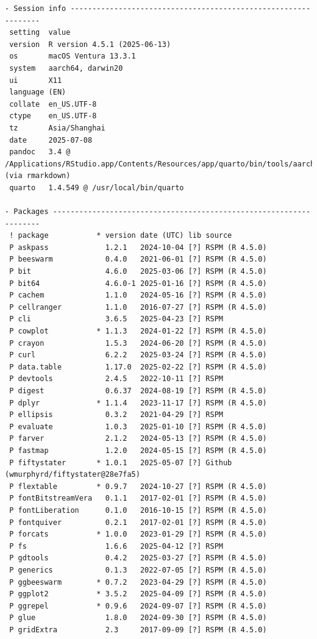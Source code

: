 \documentclass[
  12pt,
]{article}
\begin{document}
\begin{verbatim}
- Session info ---------------------------------------------------------------
 setting  value
 version  R version 4.5.1 (2025-06-13)
 os       macOS Ventura 13.3.1
 system   aarch64, darwin20
 ui       X11
 language (EN)
 collate  en_US.UTF-8
 ctype    en_US.UTF-8
 tz       Asia/Shanghai
 date     2025-07-08
 pandoc   3.4 @ /Applications/RStudio.app/Contents/Resources/app/quarto/bin/tools/aarch64/ (via rmarkdown)
 quarto   1.4.549 @ /usr/local/bin/quarto

- Packages -------------------------------------------------------------------
 ! package           * version date (UTC) lib source
 P askpass             1.2.1   2024-10-04 [?] RSPM (R 4.5.0)
 P beeswarm            0.4.0   2021-06-01 [?] RSPM (R 4.5.0)
 P bit                 4.6.0   2025-03-06 [?] RSPM (R 4.5.0)
 P bit64               4.6.0-1 2025-01-16 [?] RSPM (R 4.5.0)
 P cachem              1.1.0   2024-05-16 [?] RSPM (R 4.5.0)
 P cellranger          1.1.0   2016-07-27 [?] RSPM (R 4.5.0)
 P cli                 3.6.5   2025-04-23 [?] RSPM
 P cowplot           * 1.1.3   2024-01-22 [?] RSPM (R 4.5.0)
 P crayon              1.5.3   2024-06-20 [?] RSPM (R 4.5.0)
 P curl                6.2.2   2025-03-24 [?] RSPM (R 4.5.0)
 P data.table          1.17.0  2025-02-22 [?] RSPM (R 4.5.0)
 P devtools            2.4.5   2022-10-11 [?] RSPM
 P digest              0.6.37  2024-08-19 [?] RSPM (R 4.5.0)
 P dplyr             * 1.1.4   2023-11-17 [?] RSPM (R 4.5.0)
 P ellipsis            0.3.2   2021-04-29 [?] RSPM
 P evaluate            1.0.3   2025-01-10 [?] RSPM (R 4.5.0)
 P farver              2.1.2   2024-05-13 [?] RSPM (R 4.5.0)
 P fastmap             1.2.0   2024-05-15 [?] RSPM (R 4.5.0)
 P fiftystater       * 1.0.1   2025-05-07 [?] Github (wmurphyrd/fiftystater@28e7fa5)
 P flextable         * 0.9.7   2024-10-27 [?] RSPM (R 4.5.0)
 P fontBitstreamVera   0.1.1   2017-02-01 [?] RSPM (R 4.5.0)
 P fontLiberation      0.1.0   2016-10-15 [?] RSPM (R 4.5.0)
 P fontquiver          0.2.1   2017-02-01 [?] RSPM (R 4.5.0)
 P forcats           * 1.0.0   2023-01-29 [?] RSPM (R 4.5.0)
 P fs                  1.6.6   2025-04-12 [?] RSPM
 P gdtools             0.4.2   2025-03-27 [?] RSPM (R 4.5.0)
 P generics            0.1.3   2022-07-05 [?] RSPM (R 4.5.0)
 P ggbeeswarm        * 0.7.2   2023-04-29 [?] RSPM (R 4.5.0)
 P ggplot2           * 3.5.2   2025-04-09 [?] RSPM (R 4.5.0)
 P ggrepel           * 0.9.6   2024-09-07 [?] RSPM (R 4.5.0)
 P glue                1.8.0   2024-09-30 [?] RSPM (R 4.5.0)
 P gridExtra           2.3     2017-09-09 [?] RSPM (R 4.5.0)

\end{verbatim}
\end{document}
